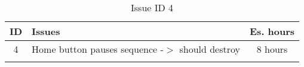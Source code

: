 \begin{longtable} { | c | p{12cm} | c | } 
\hline
	ID 	&	Issues	&		 Es. hours \\\hline
	4 	&	Home button pauses sequence -$>$ should destroy	&	8 hours \\\hline
\caption{Issue ID 4}
\label{tab:spr3_homebuttonshoulddestroy}
\end{longtable}